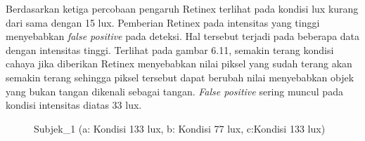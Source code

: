 
Berdasarkan ketiga percobaan pengaruh Retinex terlihat pada kondisi lux kurang dari sama dengan 15 lux. Pemberian Retinex pada intensitas yang tinggi menyebabkan \textit{false positive} pada deteksi. Hal tersebut terjadi pada beberapa data dengan intensitas tinggi. Terlihat pada gambar 6.11, semakin terang kondisi cahaya jika diberikan Retinex menyebabkan nilai piksel yang sudah terang akan semakin terang sehingga piksel tersebut dapat berubah nilai menyebabkan objek yang bukan tangan dikenali sebagai tangan. \textit{False positive} sering muncul pada kondisi intensitas diatas 33 lux.
\begin{figure}[H]
	\centering
	\quad
	\caption{Subjek\_1 (a: Kondisi 133 lux, b: Kondisi 77 lux, c:Kondisi 133 lux)}
	\label{fig:example}%
\end{figure}
